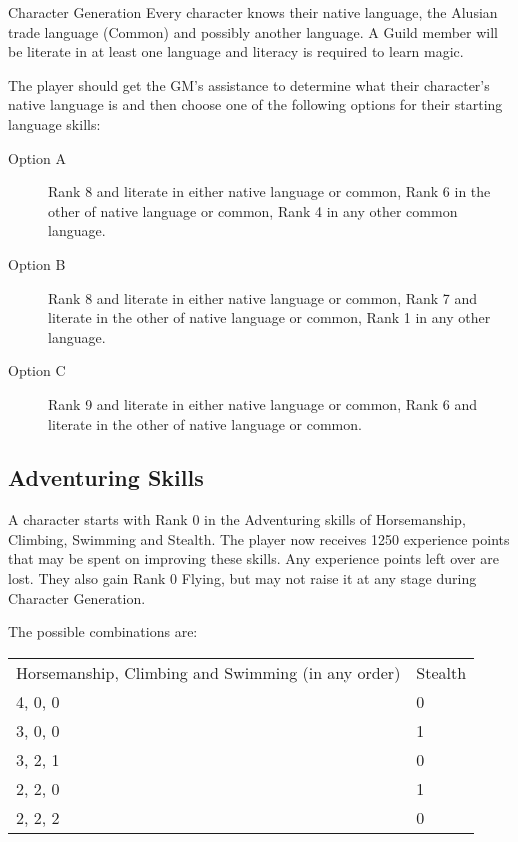 \begin{Chapter}{Character Generation}
Every character knows their native language, the Alusian trade
language (Common) and possibly another language. A Guild member will
be literate in at least one language and literacy is required to learn
magic.

The player should get the GM’s assistance to determine what their
character’s native language is and then choose one of the following
options for their starting language skills:

\begin{description}

\item[Option A] Rank 8 and literate in either native language or
  common, Rank 6 in the other of native language or common, Rank 4 in
  any other common language.

\item[Option B] Rank 8 and literate in either native language or
  common, Rank 7 and literate in the other of native language or
  common, Rank 1 in any other language.

\item[Option C] Rank 9 and literate in either native language or
  common, Rank 6 and literate in the other of native language or
  common.

\end{description}
  
\subsection{Adventuring Skills}

A character starts with Rank 0 in the Adventuring skills of
Horsemanship, Climbing, Swimming and Stealth.  The player now receives
1250 experience points that may be spent on improving these skills.
Any experience points left over are lost. They also gain Rank 0
Flying, but may not raise it at any stage during Character Generation.

The possible combinations are: 

\begin{tabularx}{\columnwidth}{Xl}
Horsemanship, Climbing and Swimming (in any order)	& Stealth \\
4, 0, 0							& 0 \\
3, 0, 0							& 1 \\
3, 2, 1							& 0 \\
2, 2, 0							& 1 \\
2, 2, 2							& 0 \\
\end{tabularx}


\end{Chapter}
